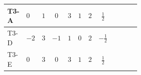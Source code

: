 \documentclass{article}
\begin{document}
\begin{landscape}
\begin{longtable}{@{}llcccccc >{\raggedright\arraybackslash}p{0.54\linewidth}@{}}
\midrule
T3-A & $0$ & $1$ & $0$ & $3$ & $1$ & $2$ & $\frac{1}{2}$ & \scriptsize\adjustbox{max width=\linewidth}{$\begin{gathered} 2 \operatorname{Tr}\!\left({y_1}\,\left({y_1}\right)^{\dagger}\right) \left({y_1}\right)_{ij} \\ +\frac{3}{4} \left({y_2}\,\left({y_2}\right)^{\dagger}\,{y_1}\right)_{ij} \\ +\frac{1}{2} \left({Y_e}\,\left({Y_e}\right)^{\dagger}\,{y_1}\right)_{ij} \\ +\left({y_1}\,\left({y_1}\right)^{\dagger}\,{y_1}\right)_{ij} \\ -\frac{9}{2} {g_2}^2 \left({y_1}\right)_{ij} \\ -\frac{3}{2} {g_Y}^2 \left({y_1}\right)_{ij}\end{gathered}$} \\
\midrule
T3-D & $-2$ & $3$ & $-1$ & $1$ & $0$ & $2$ & $-\frac{1}{2}$ & \scriptsize\adjustbox{max width=\linewidth}{$\begin{gathered} \operatorname{Tr}\!\left({y_1}\,\left({y_1}\right)^{\dagger}\right) \left({y_1}\right)_{ij} \\ +\frac{1}{2} (\left({y_2}\,\left({y_2}\right)^{\dagger}\,{y_1}\right)_{ij}+\left({Y_e}\,\left({Y_e}\right)^{\dagger}\,{y_1}\right)_{ij}+3 \left({y_1}\,\left({y_1}\right)^{\dagger}\,{y_1}\right)_{ij}) \\ -\frac{9}{2} {g_2}^2 \left({y_1}\right)_{ij} \\ -\frac{3}{2} {g_Y}^2 \left({y_1}\right)_{ij}\end{gathered}$} \\
\midrule
T3-E & $0$ & $3$ & $0$ & $3$ & $1$ & $2$ & $\frac{1}{2}$ & \scriptsize\adjustbox{max width=\linewidth}{$\begin{gathered} \operatorname{Tr}\!\left({y_1}\,\left({y_1}\right)^{\dagger}\right) \left({y_1}\right)_{ij} \\ +\frac{1}{4} (3 \left({y_2}\,\left({y_2}\right)^{\dagger}\,{y_1}\right)_{ij}+2 \left({Y_e}\,\left({Y_e}\right)^{\dagger}\,{y_1}\right)_{ij}+6 \left({y_1}\,\left({y_1}\right)^{\dagger}\,{y_1}\right)_{ij}) \\ -\frac{9}{2} {g_2}^2 \left({y_1}\right)_{ij} \\ -\frac{3}{2} {g_Y}^2 \left({y_1}\right)_{ij}\end{gathered}$} \\
\midrule
\bottomrule
\end{longtable}
\clearpage

\end{landscape}
\end{document}
